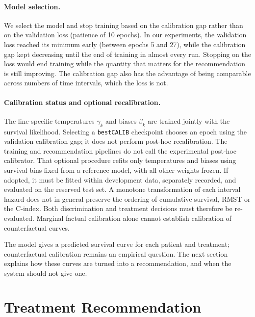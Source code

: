 \documentclass[a4paper,10pt]{article}
\begin{document}
\paragraph{Model selection.} We select the model and stop training based on the calibration gap rather than on the validation loss (patience of 10 epochs). In our experiments, the validation loss reached its minimum early (between epochs 5 and 27), while the calibration gap kept decreasing until the end of training in almost every run. Stopping on the loss would end training while the quantity that matters for the recommendation is still improving. The calibration gap also has the advantage of being comparable across numbers of time intervals, which the loss is not.

\paragraph{Calibration status and optional recalibration.} The line-specific temperatures $\gamma_k$ and biases $\beta_k$ are trained jointly with the survival likelihood. Selecting a \texttt{bestCALIB} checkpoint chooses an epoch using the validation calibration gap; it does not perform post-hoc recalibration. The training and recommendation pipelines do not call the experimental post-hoc calibrator. That optional procedure refits only temperatures and biases using survival bins fixed from a reference model, with all other weights frozen. If adopted, it must be fitted within development data, separately recorded, and evaluated on the reserved test set. A monotone transformation of each interval hazard does not in general preserve the ordering of cumulative survival, RMST or the C-index. Both discrimination and treatment decisions must therefore be re-evaluated. Marginal factual calibration alone cannot establish calibration of counterfactual curves.

The model gives a predicted survival curve for each patient and treatment; counterfactual calibration remains an empirical question. The next section explains how these curves are turned into a recommendation, and when the system should not give one.

\section{Treatment Recommendation}
\label{sec:recommendation}
\end{document}

